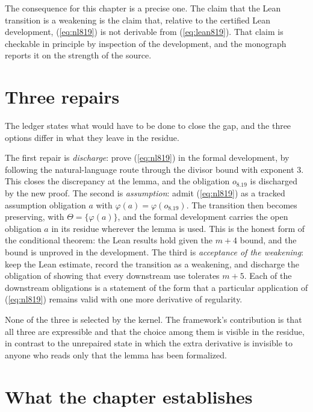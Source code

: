 The consequence for this chapter is a precise one. The claim that the Lean transition is a weakening is the claim that, relative to the certified Lean development, (\ref{eq:nl819}) is not derivable from (\ref{eq:lean819}). That claim is checkable in principle by inspection of the development, and the monograph reports it on the strength of the source.

\section{Three repairs}

The ledger states what would have to be done to close the gap, and the three options differ in what they leave in the residue.

The first repair is \emph{discharge}: prove (\ref{eq:nl819}) in the formal development, by following the natural-language route through the divisor bound with exponent $3$. This closes the discrepancy at the lemma, and the obligation $o_{8.19}$ is discharged by the new proof. The second is \emph{assumption}: admit (\ref{eq:nl819}) as a tracked assumption obligation $a$ with $\varphi(a) = \varphi(o_{8.19})$. The transition then becomes preserving, with $\Theta = \{\varphi(a)\}$, and the formal development carries the open obligation $a$ in its residue wherever the lemma is used. This is the honest form of the conditional theorem: the Lean results hold given the $m+4$ bound, and the bound is unproved in the development. The third is \emph{acceptance of the weakening}: keep the Lean estimate, record the transition as a weakening, and discharge the obligation of showing that every downstream use tolerates $m+5$. Each of the downstream obligations is a statement of the form that a particular application of (\ref{eq:nl819}) remains valid with one more derivative of regularity.

None of the three is selected by the kernel. The framework's contribution is that all three are expressible and that the choice among them is visible in the residue, in contrast to the unrepaired state in which the extra derivative is invisible to anyone who reads only that the lemma has been formalized.

\section{What the chapter establishes}

